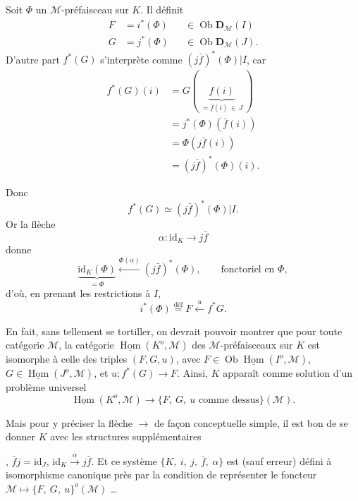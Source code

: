 \documentclass[11pt]{article}
\newcommand{\printedpage}[1]{\marginpar{\footnotesize p.~#1}}
\newcommand{\msp}[1]{\marginpar{\footnotesize [#1]}}
\newcommand{\uHom}{\underline{\operatorname{Hom}}}
\newcommand{\Ob}{\operatorname{Ob}}
\newcommand{\id}{\mathrm{id}}
\begin{document}
Soit $\Phi$ un $\mathcal{M}$-préfaisceau sur $K$. Il définit
\[
\begin{aligned}
F &= i^*(\Phi) && \in \Ob \mathbf{D}_{\mathcal{M}}(I)\\
G &= j^*(\Phi) && \in \Ob \mathbf{D}_{\mathcal{M}}(J).
\end{aligned}
\]
D'autre part $f^*(G)$ s'interprète comme $(j\bar{f})^*(\Phi)|I$, car
\[
\begin{aligned}
f^*(G)(i) &= G(\ \underbrace{f(i)}_{= \bar{f}(i) \,\in\, J}\ )\\
&= j^*(\Phi)(\bar{f}(i))\\
&= \Phi(j\bar{f}(i))\\
&= (j\bar{f})^*(\Phi)(i).
\end{aligned}
\]

\msp{page 81}
Donc
\[ f^*(G) \simeq (j\bar{f})^*(\Phi)|I. \]
Or la flèche
\[ \alpha : \id_K \longrightarrow j\bar{f} \]
donne
\[ \underbrace{\id_K(\Phi)}_{= \Phi} \xleftarrow{\Phi(\alpha)} (j\bar{f})^*(\Phi), \qquad \text{fonctoriel en } \Phi, \]
d'où, en prenant les restrictions à $I$,
\[ i^*(\Phi) \overset{\text{déf}}{=} F \xleftarrow{\ u\ } f^*G. \]

En fait, sans tellement se tortiller, on devrait pouvoir montrer que pour toute catégorie $\mathcal{M}$, la catégorie $\uHom(K^o, \mathcal{M})$ des $\mathcal{M}$-préfaisceaux sur $K$ est isomorphe à celle des triples $(F,G,u)$, avec $F \in \Ob \uHom(I^o, \mathcal{M})$, $G \in \uHom(J^o, \mathcal{M})$, et $u : f^*(G) \longrightarrow F$. Ainsi, $K$ apparaît comme solution d'un problème universel
\[ \uHom(K^o, \mathcal{M}) \longrightarrow \{F,\ G,\ u \text{ comme dessus}\}(\mathcal{M}). \]

Mais pour y préciser la flèche $\longrightarrow$ de façon conceptuelle simple, il est bon de se donner $K$ avec les structures supplémentaires , $\bar{f}j = \id_J$, $\id_K \xrightarrow{\alpha} j\bar{f}$. Et ce système %
\printedpage{7}
\msp{page 82}
$\{K,\ i,\ j,\ \bar{f},\ \alpha\}$ est (sauf erreur) défini à isomorphisme canonique près par la condition de représenter le foncteur $\mathcal{M} \longmapsto \{F,\ G,\ u\}^o(\mathcal{M})$ \dots
\end{document}
